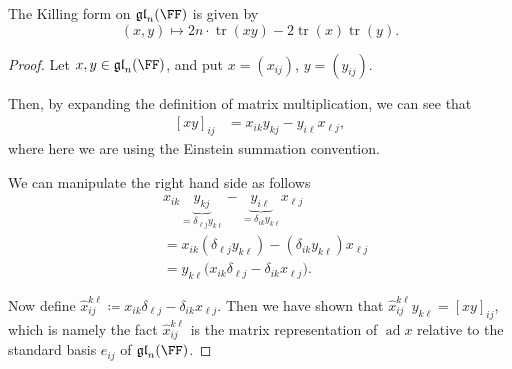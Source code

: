\documentclass{article}
\newcommand{\lb}[1]{\ensuremath{\left[{#1}\right]}}
\DeclareMathOperator{\tr}{tr}
\DeclareMathOperator{\ad}{ad}
\newcommand*\glalg{\ensuremath{\mathfrak{gl}}}
\begin{document}
\begin{theorem}
    The Killing form on $\glalg_n(\FF)$ is given by
    \[
        (x, y)
        \mapsto
        2n\cdot\tr(xy) - 2\tr(x)\tr(y).
    \]
\end{theorem}
\begin{proof}
    Let $x, y \in \glalg_n(\FF)$, and put $x = (x_{ij})$, $y = (y_{ij})$.

    Then, by expanding the definition of matrix multiplication, we can see that
    \begin{align*}
        \lb{xy}_{ij}
        &=
        x_{ik}
        y_{kj}
        -
        y_{i\ell}x_{\ell j},
    \end{align*}
    where here we are using the Einstein summation convention.

    We can manipulate the right hand side as follows
    \begin{align*}
        &
        x_{ik}
        \underbrace{y_{kj}}_{=\delta_{\ell j}y_{k\ell}}
        -
        \underbrace{y_{i\ell}}_{=\delta_{ik}y_{k\ell}}
        x_{\ell j}
        \\
        &=
        x_{ik}
        (\delta_{\ell j}y_{k\ell})
        -
        (\delta_{ik}y_{k\ell})
        x_{\ell j}
        \\
        &=
        y_{k\ell}
        \Big(
            x_{ik}\delta_{\ell j}
            -
            \delta_{ik}x_{\ell j}
        \Big).
    \end{align*}

    Now define $\hat{x}_{ij}^{k\ell} \coloneq x_{ik}\delta_{\ell j} - \delta_{ik} x_{\ell j}$.
    Then we have shown that $\hat{x}_{ij}^{k\ell} y_{k\ell} = \lb{xy}_{ij}$, which is namely the fact $\hat{x}_{ij}^{k\ell}$ is the matrix representation of $\ad x$ relative to the standard basis $e_{ij}$ of $\glalg_n(\FF)$.


\end{proof}
\end{document}
